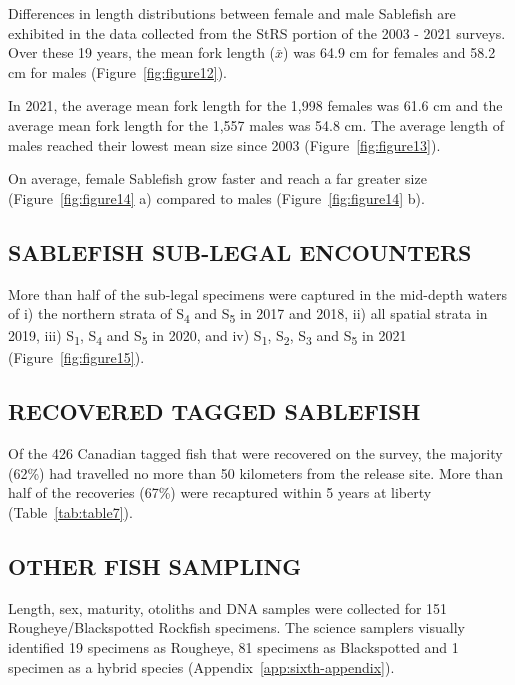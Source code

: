 \documentclass[12pt]{article}\usepackage[]{graphicx}\usepackage[]{color}
\begin{document}
Differences in length distributions between female and male Sablefish are exhibited in the data collected from the StRS portion of the 2003 - 2021 surveys. Over these 19 years, the mean fork length (\(\bar{x}\)) was 64.9 cm for females and 58.2 cm for males (Figure~\ref{fig:figure12}).

In 2021, the average mean fork length for the 1,998 females was 61.6 cm and the average mean fork length for the 1,557 males was 54.8 cm. The average length of males reached their lowest mean size since 2003 (Figure~\ref{fig:figure13}).

On average, female Sablefish grow faster and reach a far greater size (Figure~\ref{fig:figure14} a) compared to males (Figure~\ref{fig:figure14} b).

\hypertarget{sablefish-sub-legal-encounters}{%
\subsection{SABLEFISH SUB-LEGAL ENCOUNTERS}\label{sablefish-sub-legal-encounters}}

More than half of the sub-legal specimens were captured in the mid-depth waters of i) the northern strata of S\textsubscript{4} and S\textsubscript{5} in 2017 and 2018, ii) all spatial strata in 2019, iii) S\textsubscript{1}, S\textsubscript{4} and S\textsubscript{5} in 2020, and iv) S\textsubscript{1}, S\textsubscript{2}, S\textsubscript{3} and S\textsubscript{5} in 2021 (Figure~\ref{fig:figure15}).

\hypertarget{recovered-tagged-sablefish}{%
\subsection{RECOVERED TAGGED SABLEFISH}\label{recovered-tagged-sablefish}}

Of the 426 Canadian tagged fish that were recovered on the survey, the majority (62\%) had travelled no more than 50 kilometers from the release site. More than half of the recoveries (67\%) were recaptured within 5 years at liberty (Table~\ref{tab:table7}).

\hypertarget{other-fish-sampling}{%
\subsection{OTHER FISH SAMPLING}\label{other-fish-sampling}}

Length, sex, maturity, otoliths and DNA samples were collected for 151 Rougheye/Blackspotted Rockfish specimens. The science samplers visually identified 19 specimens as Rougheye, 81 specimens as Blackspotted and 1 specimen as a hybrid species (Appendix~\ref{app:sixth-appendix}).
\end{document}
